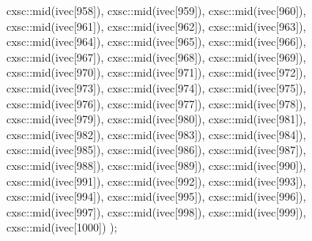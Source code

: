 \begin{DoxyCode}
{  cxsc::mid(ivec[958]),
  cxsc::mid(ivec[959]),
  cxsc::mid(ivec[960]),
  cxsc::mid(ivec[961]),
  cxsc::mid(ivec[962]),
  cxsc::mid(ivec[963]),
  cxsc::mid(ivec[964]),
  cxsc::mid(ivec[965]),
  cxsc::mid(ivec[966]),
  cxsc::mid(ivec[967]),
  cxsc::mid(ivec[968]),
  cxsc::mid(ivec[969]),
  cxsc::mid(ivec[970]),
  cxsc::mid(ivec[971]),
  cxsc::mid(ivec[972]),
  cxsc::mid(ivec[973]),
  cxsc::mid(ivec[974]),
  cxsc::mid(ivec[975]),
  cxsc::mid(ivec[976]),
  cxsc::mid(ivec[977]),
  cxsc::mid(ivec[978]),
  cxsc::mid(ivec[979]),
  cxsc::mid(ivec[980]),
  cxsc::mid(ivec[981]),
  cxsc::mid(ivec[982]),
  cxsc::mid(ivec[983]),
  cxsc::mid(ivec[984]),
  cxsc::mid(ivec[985]),
  cxsc::mid(ivec[986]),
  cxsc::mid(ivec[987]),
  cxsc::mid(ivec[988]),
  cxsc::mid(ivec[989]),
  cxsc::mid(ivec[990]),
  cxsc::mid(ivec[991]),
  cxsc::mid(ivec[992]),
  cxsc::mid(ivec[993]),
  cxsc::mid(ivec[994]),
  cxsc::mid(ivec[995]),
  cxsc::mid(ivec[996]),
  cxsc::mid(ivec[997]),
  cxsc::mid(ivec[998]),
  cxsc::mid(ivec[999]),
  cxsc::mid(ivec[1000])
  );
}
\end{DoxyCode}
